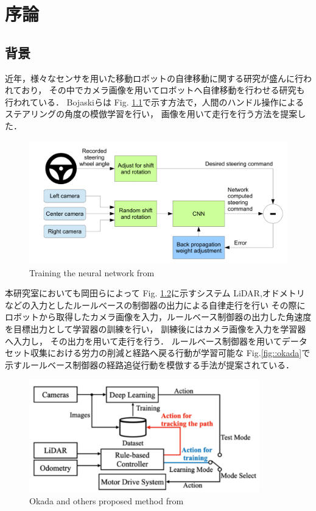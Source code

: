 \chapter{序論}
\section{背景}
近年，様々なセンサを用いた移動ロボットの自律移動に関する研究が盛んに行われており，
その中でカメラ画像を用いてロボットへ自律移動を行わせる研究も行われている．
Bojaskiら\cite{Nvidia}は
Fig. \ref{fig::nvidia}で示す方法で，人間のハンドル操作によるステアリングの角度の模倣学習を行い，
画像を用いて走行を行う方法を提案した．

\begin{figure}[h]
    \centering
    \includegraphics[width = 13cm]{./figs/EndtoEnd_Learning_for_Self-Driving_Cars.pdf}
    \caption{Training the neural network from \cite{Nvidia}}
    \label{fig::nvidia}
\end{figure}

\newpage
本研究室においても岡田ら\cite{okada}によって
Fig. \ref{fig::okada_sys}に示すシステム
LiDAR,オドメトリなどの入力としたルールべースの制御器の出力による自律走行を行い
その際にロボットから取得したカメラ画像を入力，ルールベース制御器の出力した角速度を目標出力として学習器の訓練を行い，
訓練後にはカメラ画像を入力を学習器へ入力し，
その出力を用いて走行を行う．
ルールベース制御器を用いてデータセット収集における労力の削減と経路へ戻る行動が学習可能な
Fig.\ref{fig::okada}で示すルールベース制御器の経路追従行動を模倣する手法が提案されている．
\begin{figure}[h]
    \centering
    \includegraphics[width = 10cm]{./figs/okada_sys.png}
    \caption{Okada and others proposed method from \cite{okada}}
    \label{fig::okada_sys}
\end{figure}


